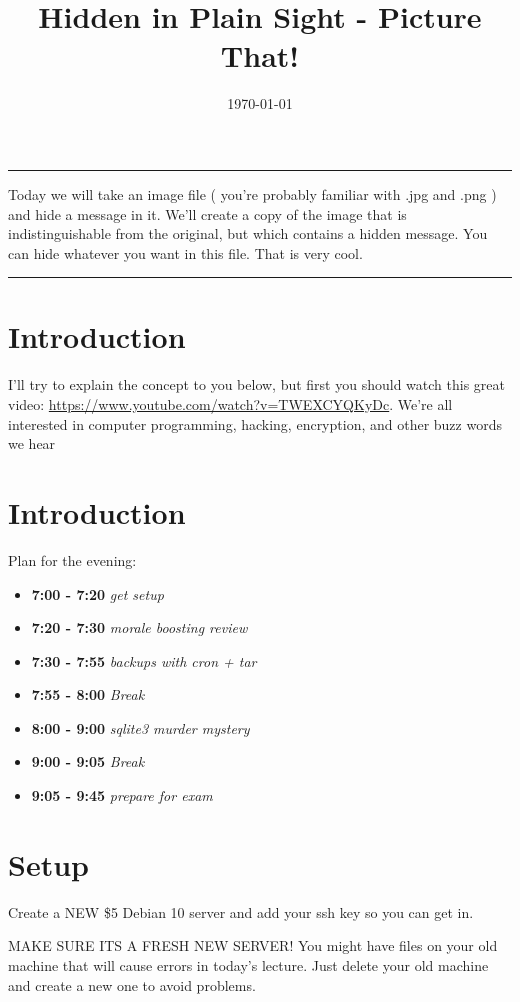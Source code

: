 \documentclass[12pt,a4paper]{article}
\newcommand{\schedule}[2]{\textbf{#1} \textit{#2}}
\renewenvironment{abstract}{%
\hfill\begin{minipage}{0.95\textwidth}
\rule{\textwidth}{1pt}}
{\par\noindent\rule{\textwidth}{1pt}\end{minipage}}
\begin{document}
%
\title{\textbf{Hidden in Plain Sight - Picture That!}}
\date{\today}
%
\maketitle
%
\begin{abstract}
Today we will take an image file ( you're probably familiar with .jpg and .png
) and hide a message in it. We'll create a copy of the image that is
indistinguishable from the original, but which contains a hidden message. You can hide whatever you
want in this file. That is very cool.
\end{abstract}

\section{Introduction}

I'll try to explain the concept to you below, but first you should watch this
great video: \url{https://www.youtube.com/watch?v=TWEXCYQKyDc}. We're all
interested in computer programming, hacking, encryption, and other buzz words we
hear 


\section{Introduction}
Plan for the evening:
\begin{itemize}
\setlength\itemsep{0em}
\item \schedule{7:00 - 7:20}{get setup}
\item \schedule{7:20 - 7:30}{morale boosting review}
\item \schedule{7:30 - 7:55}{backups with cron + tar}
\item \schedule{7:55 - 8:00}{Break}
\item \schedule{8:00 - 9:00}{sqlite3 murder mystery}
\item \schedule{9:00 - 9:05}{Break}
\item \schedule{9:05 - 9:45}{prepare for exam}
\end{itemize}

\section{Setup}

Create a NEW \$5 Debian 10 server and add your ssh key so you can get in.

{\LARGE MAKE SURE ITS A FRESH NEW SERVER! You might have files on your old
machine that will cause errors in today's lecture. Just delete your old machine
and create a new one to avoid problems.}
\end{document}
